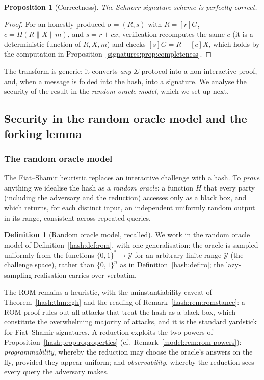 \documentclass[11pt,a4paper]{article}
\newtheorem{proposition}[theorem]{Proposition}
\theoremstyle{definition}
\newtheorem{definition}[theorem]{Definition}
\theoremstyle{remark}
\begin{document}
\begin{proposition}[Correctness]\label{signatures:prop:sigcorrect}
The Schnorr signature scheme is perfectly correct.
\end{proposition}

\begin{proof}
For an honestly produced \(\sigma = (R, s)\) with \(R = [r]G\), \(c = H(R\|X\|m)\), and \(s = r + cx\), verification recomputes the same \(c\) (it is a deterministic function of \(R, X, m\)) and checks \([s]G = R + [c]X\), which holds by the computation in Proposition~\ref{signatures:prop:completeness}.
\end{proof}

The transform is generic: it converts \emph{any} \(\Sigma\)-protocol into a non-interactive proof, and, when a message is folded into the hash, into a signature. We analyse the security of the result in the \emph{random oracle model}, which we set up next.

\subsection{Security in the random oracle model and the forking lemma}\label{signatures:subsec:rom}

\subsubsection{The random oracle model}\label{signatures:subsubsec:rom}

The Fiat--Shamir heuristic replaces an interactive challenge with a hash. To \emph{prove} anything we idealise the hash as a \emph{random oracle}: a function \(H\) that every party (including the adversary and the reduction) accesses only as a black box, and which returns, for each distinct input, an independent uniformly random output in its range, consistent across repeated queries.

\begin{definition}[Random oracle model, recalled]\label{signatures:def:rom}
We work in the random oracle model of Definition~\ref{hash:def:rom}, with one generalisation: the oracle is sampled uniformly from the functions \(\{0,1\}^\ast \to \mathcal{Y}\) for an arbitrary finite range \(\mathcal{Y}\) (the challenge space), rather than \(\{0,1\}^n\) as in Definition~\ref{hash:def:ro}; the lazy-sampling realisation carries over verbatim.
\end{definition}

The ROM remains a heuristic, with the uninstantiability caveat of Theorem~\ref{hash:thm:cgh} and the reading of Remark~\ref{hash:rem:romstance}: a ROM proof rules out all attacks that treat the hash as a black box, which constitute the overwhelming majority of attacks, and it is the standard yardstick for Fiat--Shamir signatures. A reduction exploits the two powers of Proposition~\ref{hash:prop:roproperties} (cf.\ Remark~\ref{model:rem:rom-powers}): \emph{programmability}, whereby the reduction may choose the oracle's answers on the fly, provided they appear uniform; and \emph{observability}, whereby the reduction sees every query the adversary makes.
\end{document}

